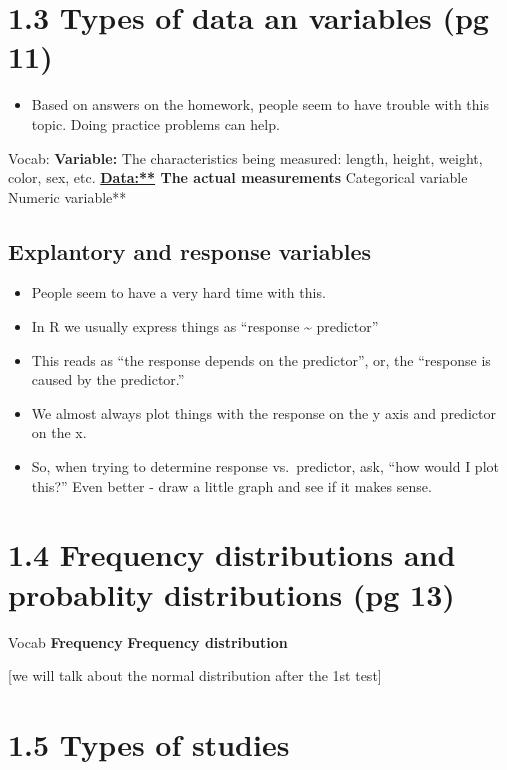 \documentclass[]{book}
\providecommand{\tightlist}{%
  \setlength{\itemsep}{0pt}\setlength{\parskip}{0pt}}
\theoremstyle{definition}
\theoremstyle{definition}
\theoremstyle{definition}
\theoremstyle{remark}
\begin{document}
\section{1.3 Types of data an variables (pg
11)}\label{types-of-data-an-variables-pg-11}

\begin{itemize}
\tightlist
\item
  Based on answers on the homework, people seem to have trouble with
  this topic. Doing practice problems can help.
\end{itemize}

Vocab: \textbf{Variable:} The characteristics being measured: length,
height, weight, color, sex, etc. \textbf{\url{Data:**} The actual
measurements }Categorical variable\textbf{ }Numeric variable**

\subsection{Explantory and response
variables}\label{explantory-and-response-variables}

\begin{itemize}
\tightlist
\item
  People seem to have a very hard time with this.
\item
  In R we usually express things as ``response \textasciitilde{}
  predictor''
\item
  This reads as ``the response depends on the predictor'', or, the
  ``response is caused by the predictor.''
\item
  We almost always plot things with the response on the y axis and
  predictor on the x.
\item
  So, when trying to determine response vs.~predictor, ask, ``how would
  I plot this?'' Even better - draw a little graph and see if it makes
  sense.
\end{itemize}

\section{1.4 Frequency distributions and probablity distributions (pg
13)}\label{frequency-distributions-and-probablity-distributions-pg-13}

Vocab \textbf{Frequency} \textbf{Frequency distribution}

{[}we will talk about the normal distribution after the 1st test{]}

\section{1.5 Types of studies}\label{types-of-studies}
\end{document}
